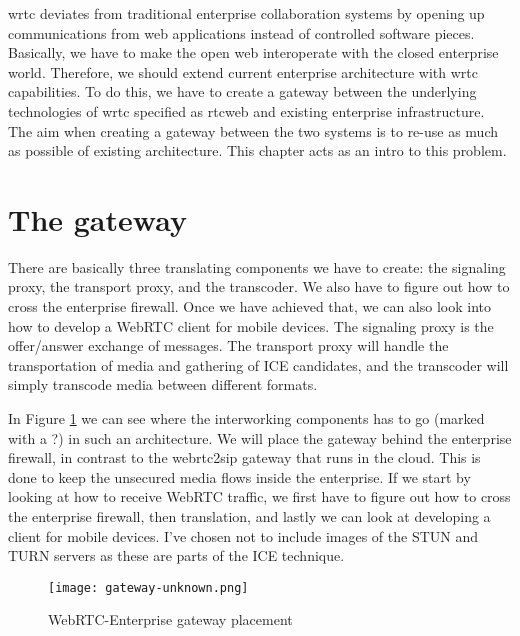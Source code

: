 \gls{wrtc} deviates from traditional enterprise collaboration systems by opening up communications from web applications instead of controlled software pieces. Basically, we have to make the open web interoperate with the closed enterprise world. Therefore, we should extend current enterprise architecture with \gls{wrtc} capabilities. To do this, we have to create a gateway between the underlying technologies of \gls{wrtc} specified as \gls{rtcweb} and existing enterprise infrastructure. The aim when creating a gateway between the two systems is to re-use as much as possible of existing architecture. This chapter acts as an intro to this problem.

\section{The gateway}
There are basically three translating components we have to create: the signaling proxy, the transport proxy, and the transcoder. We also have to figure out how to cross the enterprise firewall. Once we have achieved that, we can also look into how to develop a WebRTC client for mobile devices. The signaling proxy is the offer/answer exchange of messages. The transport proxy will handle the transportation of media and gathering of ICE candidates, and the transcoder will simply transcode media between different formats.

In Figure \ref{fig:gateway-layers} we can see where the interworking components has to go (marked with a ?) in such an architecture. We will place the gateway behind the enterprise firewall, in contrast to the webrtc2sip gateway that runs in the cloud. This is done to keep the unsecured media flows inside the enterprise. If we start by looking at how to receive WebRTC traffic, we first have to figure out how to cross the enterprise firewall, then translation, and lastly we can look at developing a client for mobile devices. I've chosen not to include images of the STUN and TURN servers as these are parts of the ICE technique.
\\
\begin{figure}[here]
\centerline{\texttt{[image: gateway-unknown.png]}}
\caption{WebRTC-Enterprise gateway placement}
\label{fig:gateway-layers}
\end{figure}

